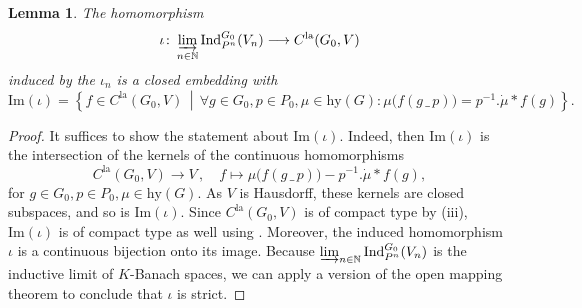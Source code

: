 \documentclass[a4paper, reqno, 10pt]{amsart}
\newtheorem{lemma}[theorem]{Lemma}
\theoremstyle{definition}
\numberwithin{equation}{section}
\newcommand{\blank}{{\,\_\,}}
\newcommand{\hy}{{\mathrm{hy}}}
\renewcommand{\Im}{{\mathrm{Im}}}
\newcommand{\Ind}{{\mathrm{Ind}}}
\newcommand{\la}{{\mathrm{la}}}
\newcommand{\lra}{\longrightarrow}
\newcommand{\lto}{\longmapsto}
\let\originalmiddle\middle
\renewcommand{\middle}[1]{\,\originalmiddle#1\,}
\newcommand{\BN}{{\mathbb {N}}}
\begin{document}
\begin{lemma}\label{Lemma 3 - Embedding of direct limit of inductions}
	The homomorphism
	\begin{equation*}
		\iota\colon \varinjlim_{n\in \BN} \Ind^{G_0}_{P^n} (V_n) \lra C^\la (G_0,V)
	\end{equation*}
	induced by the $\iota_n$ is a closed embedding with
	\begin{equation*}
		\Im(\iota) = \left\{ f\in C^\la(G_0,V)\middle{|} \forall g \in G_0, p\in P_0, \mu \in \hy(G): \mu \big(f(g\blank p) \big) = p^{-1}. \dot{\mu} \ast f(g)\right\} .
	\end{equation*}
\end{lemma}
\begin{proof}
	It suffices to show the statement about $\Im(\iota)$.
	Indeed, then $\Im(\iota)$ is the intersection of the kernels of the continuous homomorphisms
	\begin{equation}\label{Eq 3 - Family of homomorphisms for limit of inductions}
		C^\la (G_0,V) \lra V \,,\quad f \lto \mu \big( f(g \blank p) \big) - p^{-1} . \dot{\mu} \ast f(g) ,
	\end{equation}
	for $g \in G_0, p\in P_0, \mu \in \hy(G)$.
	As $V$ is Hausdorff, these kernels are closed subspaces, and so is $\Im(\iota)$.
	Since $C^\la(G_0,V)$ is of compact type by  (iii), $\Im(\iota)$ is of compact type as well using .
	Moreover, the induced homomorphism $\iota$ is a continuous bijection onto its image.
	Because $\varinjlim_{n\in \BN} \Ind^{G_0}_{P^n} (V_n)$ is the inductive limit of $K$-Banach spaces, we can apply a version of the open mapping theorem \cite[II.\ \S 4.6 Cor.]{Bourbaki87TopVectSp1to5} to conclude that $\iota$ is strict.
	

\end{proof}
\end{document}
